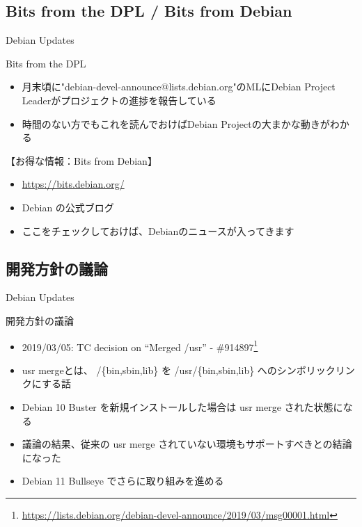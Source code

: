 \subsection{Bits from the DPL / Bits from Debian}

\begin{frame}{Debian Updates}%

Bits from the DPL

\begin{itemize}
\item 月末頃に"debian-devel-announce@lists.debian.org"のMLにDebian Project Leaderがプロジェクトの進捗を報告している
\item 時間のない方でもこれを読んでおけばDebian Projectの大まかな動きがわかる
\end{itemize}

【お得な情報：Bits from Debian】

\begin{itemize}
\item \url{https://bits.debian.org/}
\item Debian の公式ブログ
\item ここをチェックしておけば、Debianのニュースが入ってきます
\end{itemize}

\end{frame}


\subsection{開発方針の議論}

\begin{frame}{Debian Updates}%

開発方針の議論
  
\begin{itemize}
\item 2019/03/05: TC decision on ``Merged /usr'' - \#914897\footnote{\url{https://lists.debian.org/debian-devel-announce/2019/03/msg00001.html}}
\item usr mergeとは、 /\{bin,sbin,lib\} を /usr/\{bin,sbin,lib\} へのシンボリックリンクにする話
\item Debian 10 Buster を新規インストールした場合は usr merge された状態になる
\item 議論の結果、従来の usr merge されていない環境もサポートすべきとの結論になった
\item Debian 11 Bullseye でさらに取り組みを進める
\end{itemize}

\end{frame}


